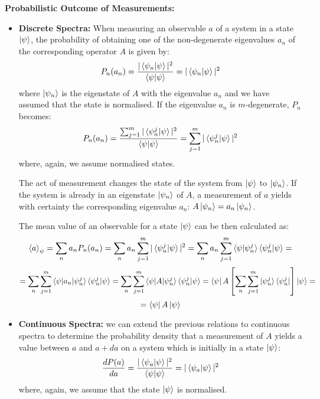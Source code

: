 \begin{postulate} \label{post_4}
    \textbf{Probabilistic Outcome of Measurements:}
    \begin{itemize}
        \item \textbf{Discrete Spectra:} When measuring an observable $a$ of a system in a state $\ket{\psi}$, the probability of obtaining one of the non-degenerate eigenvalues $a_n$ of the corresponding operator $A$ is given by:
        \begin{equation}
            P_n(a_n) = \frac{|\braket{\psi_n|\psi}|^2}{\braket{\psi|\psi}} = |\braket{\psi_n|\psi}|^2
        \end{equation}
        where $\ket{\psi_n}$ is the eigenstate of $A$ with the eigenvalue $a_n$ and we have assumed that the state is normalised. If the eigenvalue $a_n$ is $m$-degenerate, $P_n$ becomes:
        \begin{equation}
            P_n(a_n) = \frac{\sum_{j=1}^m|\braket{\psi_n^j|\psi}|^2}{\braket{\psi|\psi}} = \sum_{j=1}^m |\braket{\psi_n^j|\psi}|^2
        \end{equation}
        where, again, we assume normalised states.
        
        The act of measurement changes the state of the system from $\ket{\psi}$ to $\ket{\psi_n}$. If the system is already in an eigenstate $\ket{\psi_n}$ of $A$, a measurement of $a$ yields with certainty the corresponding eigenvalue $a_n$: $A\ket{\psi_n} = a_n\ket{\psi_n}$.

        The mean value of an observable for a state $\ket{\psi}$ can be then calculated as:
        \begin{equation*}
            \braket{a}_\psi = \sum_n a_n P_n(a_n) = \sum_n a_n \sum_{j=1}^m |\braket{\psi_n^j|\psi}|^2 = \sum_n a_n \sum_{j=1}^m \braket{\psi|\psi_n^j}\braket{\psi_n^j|\psi} = 
        \end{equation*}
        \begin{equation*}
            = \sum_n \sum_{j=1}^m \braket{\psi|a_n|\psi_n^j}\braket{\psi_n^j|\psi} = \sum_n \sum_{j=1}^m \braket{\psi|A|\psi_n^j}\braket{\psi_n^j|\psi} = \bra{\psi}A \left[\sum_n \sum_{j=1}^m \ket{\psi_n^j}\bra{\psi_n^j}\right]\ket{\psi} =
        \end{equation*}
        \begin{equation}
            = \bra{\psi}A\ket{\psi}
        \end{equation}

        \item \textbf{Continuous Spectra:} we can extend the previous relations to continuous spectra to determine the probability density that a measurement of $A$ yields a value between $a$ and $a + da$ on a system which is initially in a state $\ket{\psi}$:
        \begin{equation}
            \frac{dP(a)}{da} = \frac{|\braket{\psi_a|\psi}|^2}{\braket{\psi|\psi}} = |\braket{\psi_a|\psi}|^2
        \end{equation}
        where, again, we assume that the state $\ket{\psi}$ is normalised. 
        

\end{itemize}
\end{postulate}
